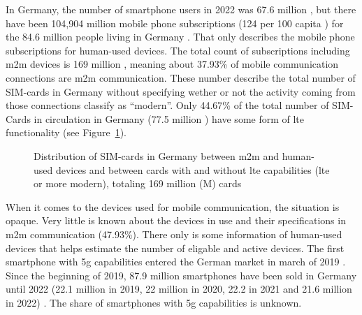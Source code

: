\documentclass[11pt,a4paper]{article}
\begin{document}
In Germany, the number of smartphone users in 2022 was 67.6 million \citep{smartphonenutzerDeutschland}, but there have been 104,904 million mobile phone subscriptions (124 per 100 capita \citep{mobilesubscriptionsDeutschland}) for the 84.6 million people living in Germany \citep{consensusDE2022}.
That only describes the mobile phone subscriptions for human-used devices.
The total count of subscriptions including \acrshort{m2m} devices is 169 million \citep{totalmobilesubscriptionsDeutschland}, meaning about 37.93\% of mobile communication connections are \acrshort{m2m} communication.
These number describe the total number of SIM-cards in Germany without specifying wether or not the activity coming from those connections classify as \enquote{modern}.
Only 44.67\% of the total number of SIM-Cards in circulation in Germany (77.5 million \citep{simCardsDeutschland}) have some form of \acrshort{lte} functionality (see Figure~\ref{fig:simdistribution}).

\begin{figure}[t]


  \caption{Distribution of SIM-cards in Germany between \acrlong*{m2m} and human-used devices and between cards with and without \acrshort{lte} capabilities (\acrshort{lte} or more modern), totaling 169 million (M) cards}
  \label{fig:simdistribution}
\end{figure}

When it comes to the devices used for mobile communication, the situation is opaque.
Very little is known about the devices in use and their specifications in \acrshort{m2m} communication (47.93\%).
There only is some information of human-used devices that helps estimate the number of eligable and active devices.
The first smartphone with \acrshort{5g} capabilities entered the German market in march of 2019 \citep{smartphonemodells5G}.
Since the beginning of 2019, 87.9 million smartphones have been sold in Germany until 2022 (22.1 million in 2019, 22 million in 2020, 22.2 in 2021 and 21.6 million in 2022) \citep{smartphonenutzungDeutschland}.
The share of smartphones with \acrshort{5g} capabilities is unknown.
\end{document}
